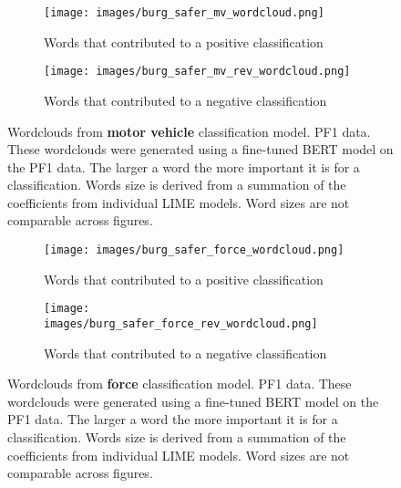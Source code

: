 \begin{figure}
     \centering
     \begin{subfigure}[b]{0.9\textwidth}
         \centering
         \texttt{[image: images/burg\_safer\_mv\_wordcloud.png]}
         \caption{Words that contributed to a positive classification}
         \label{fig: wordcloud_mv}
     \end{subfigure}
     \vfill
     \begin{subfigure}[b]{0.9\textwidth}
         \centering
         \texttt{[image: images/burg\_safer\_mv\_rev\_wordcloud.png]}
         \caption{Words that contributed to a negative classification}
         \label{fig: wordcloud_mv_rev}
     \end{subfigure}
        \caption[Wordclouds from  \textbf{motor vehicle} classification model. PF1 data.]{Wordclouds from  \textbf{motor vehicle} classification model. PF1 data. These wordclouds were generated using a fine-tuned BERT model on the PF1 data. The larger a word the more important it is for a classification. Words size is derived from a summation of the coefficients from individual LIME models. Word sizes are not comparable across figures.}
        \label{fig:wordcloud_mv_both}
        
\end{figure}


\begin{figure}
     \centering
     \begin{subfigure}[b]{0.9\textwidth}
         \centering
         \texttt{[image: images/burg\_safer\_force\_wordcloud.png]}
         \caption{Words that contributed to a positive classification}
         \label{fig: wordcloud_force}
     \end{subfigure}
     \vfill
     \begin{subfigure}[b]{0.9\textwidth}
         \centering
         \texttt{[image: images/burg\_safer\_force\_rev\_wordcloud.png]}
         \caption{Words that contributed to a negative classification}
         \label{fig: wordcloud_mv_force}
     \end{subfigure}
        \caption[Wordclouds from \textbf{force} classification model. PF1 data.]{{Wordclouds from \textbf{force} classification model. PF1 data.} These wordclouds were generated using a fine-tuned BERT model on the PF1 data. The larger a word the more important it is for a classification. Words size is derived from a summation of the coefficients from individual LIME models. Word sizes are not comparable across figures.}
        \label{fig:wordcloud_mv_both}
        
\end{figure}

